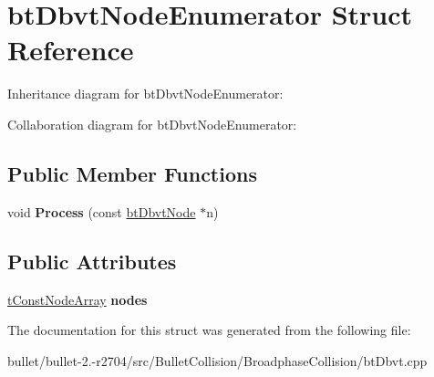 \hypertarget{structbt_dbvt_node_enumerator}{\section{bt\+Dbvt\+Node\+Enumerator Struct Reference}
\label{structbt_dbvt_node_enumerator}
}


Inheritance diagram for bt\+Dbvt\+Node\+Enumerator\+:


Collaboration diagram for bt\+Dbvt\+Node\+Enumerator\+:
\subsection*{Public Member Functions}
\begin{DoxyCompactItemize}
\item 
\hypertarget{structbt_dbvt_node_enumerator_add4f018f474f3471311b29feaa85ea62}{void {\bfseries Process} (const \hyperlink{structbt_dbvt_node}{bt\+Dbvt\+Node} $\ast$n)}\label{structbt_dbvt_node_enumerator_add4f018f474f3471311b29feaa85ea62}

\end{DoxyCompactItemize}
\subsection*{Public Attributes}
\begin{DoxyCompactItemize}
\item 
\hypertarget{structbt_dbvt_node_enumerator_ab590f9eec585fa983d962351f88a004e}{\hyperlink{classbt_aligned_object_array}{t\+Const\+Node\+Array} {\bfseries nodes}}\label{structbt_dbvt_node_enumerator_ab590f9eec585fa983d962351f88a004e}

\end{DoxyCompactItemize}


The documentation for this struct was generated from the following file\+:\begin{DoxyCompactItemize}
\item 
bullet/bullet-\/2.-\/r2704/src/\+Bullet\+Collision/\+Broadphase\+Collision/bt\+Dbvt.\+cpp\end{DoxyCompactItemize}
